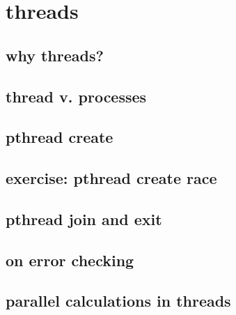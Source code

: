 
\section{threads}

\subsection{why threads?}



\subsection{thread v. processes}



\subsection{pthread create}



\subsection{exercise: pthread create race}



\subsection{pthread join and exit}



\subsection{on error checking}



\subsection{parallel calculations in threads}







